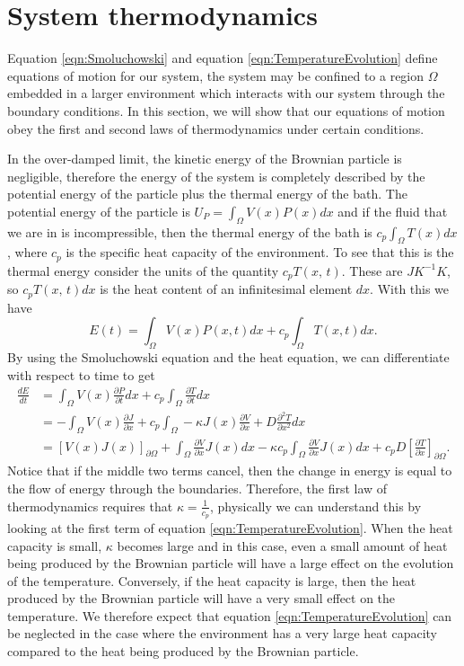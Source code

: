 \section{System thermodynamics} \label{thermodynamics}
Equation \ref{eqn:Smoluchowski} and equation \ref{eqn:TemperatureEvolution} define equations of motion for our system, the system may be confined to a region $\Omega$ embedded in a larger environment which interacts with our system through the boundary conditions. In this section, we will show that our equations of motion obey the first and second laws of thermodynamics under certain conditions.

In the over-damped limit, the kinetic energy of the Brownian particle is negligible, therefore the energy of the system is completely described by the potential energy of the particle plus the thermal energy of the bath. The potential energy of the particle is $U_P = \int_{\Omega} V(x) P(x) dx$ and if the fluid that we are in is incompressible, then the thermal energy of the bath is $c_p \int_{\Omega} T(x) dx$, where $c_p$ is the specific heat capacity of the environment. To see that this is the thermal energy consider the units of the quantity $c_p T(x, \, t)$. These are $J K^{-1} K$, so $c_p T(x, \, t) dx$ is the heat content of an infinitesimal element $dx$. With this we have
\begin{equation}
E(t) = \int_{\Omega} V(x)P(x, t) dx + c_p \int_{\Omega} T(x, t) dx. \label{eqn:energy}
\end{equation}
By using the Smoluchowski equation and the heat equation, we can differentiate with respect to time to get
\begin{align}
\frac{d E}{d t} & = \int_{\Omega} V(x) \frac{\partial P}{\partial t} dx + c_p \int_{\Omega} \frac{\partial T}{\partial t} dx \\
 & = -\int_{\Omega} V(x) \frac{\partial J}{\partial x} + c_p \int_{\Omega} -\kappa J(x) \frac{\partial V}{\partial x} + D \frac{\partial^2 T}{\partial x^2} dx \\
 & = [V(x)J(x)]_{\partial \Omega}+ \int_{\Omega} \frac{\partial V}{\partial x} J(x) dx - \kappa c_p \int_{\Omega} \frac{\partial V}{\partial x} J(x) dx + c_p D \left [\frac{\partial T}{\partial x} \right]_{\partial \Omega}.
\end{align}
Notice that if the middle two terms cancel, then the change in energy is equal to the flow of energy through the boundaries. Therefore, the first law of thermodynamics requires that $\kappa = \frac{1}{c_p}$, physically we can understand this by looking at the first term of equation \ref{eqn:TemperatureEvolution}. When the heat capacity is small, $\kappa$ becomes large and in this case, even a small amount of heat being produced by the Brownian particle will have a large effect on the evolution of the temperature. Conversely, if the heat capacity is large, then the heat produced by the Brownian particle will have a very small effect on the temperature. We therefore expect that equation \ref{eqn:TemperatureEvolution} can be neglected in the case where the environment has a very large heat capacity compared to the heat being produced by the Brownian particle.

